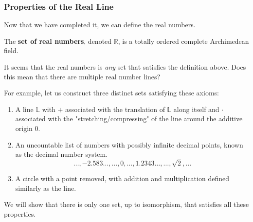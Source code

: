   \subsubsection{Properties of the Real Line} 

    Now that we have completed it, we can define the real numbers. 

    \begin{definition}
      The \textbf{set of real numbers}, denoted $\mathbb{R}$, is a totally ordered complete Archimedean field. 
    \end{definition} 

    It seems that the real numbers is \textit{any} set that satisfies the definition above. Does this mean that there are multiple real number lines? 

    \begin{example}
      For example, let us construct three distinct sets satisfying these axioms: 
      \begin{enumerate}
        \item A line $\mathbb{L}$ with $+$ associated with the translation of $\mathbb{L}$ along itself and $\cdot$ associated with the "stretching/compressing" of the line around the additive origin $0$. 
        \item An uncountable list of numbers with possibly infinite decimal points, known as the decimal number system. 
        \begin{equation}
          \ldots, -2.583\ldots, \ldots , 0, \ldots, 1.2343\ldots, \ldots, \sqrt{2}, \ldots
        \end{equation}
        \item A circle with a point removed, with addition and multiplication defined similarly as the line. 
      \end{enumerate}
    \end{example}

    We will show that there is only one set, up to isomorphism, that satisfies all these properties. 

